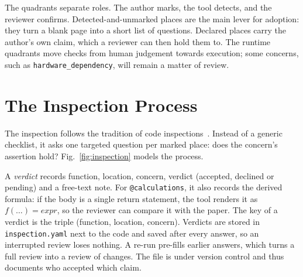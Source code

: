 \documentclass[conference,10pt]{IEEEtran}
\newcommand{\cc}[1]{\texttt{#1}}
\begin{document}
The quadrants separate roles. The author marks, the tool detects, and the reviewer confirms. Detected-and-unmarked places are the main lever for adoption: they turn a blank page into a short list of questions. Declared places carry the author's own claim, which a reviewer can then hold them to. The runtime quadrants move checks from human judgement towards execution; some concerns, such as \cc{hardware\_dependency}, will remain a matter of review.

\section{The Inspection Process}
The inspection follows the tradition of code inspections~\cite{fagan1976}. Instead of a generic checklist, it asks one targeted question per marked place: does the concern's assertion hold? Fig.~\ref{fig:inspection} models the process.

A \emph{verdict} records function, location, concern, verdict (accepted, declined or pending) and a free-text note. For \cc{@calculations}, it also records the derived formula: if the body is a single return statement, the tool renders it as $f(\ldots)=\mathit{expr}$, so the reviewer can compare it with the paper. The key of a verdict is the triple (function, location, concern). Verdicts are stored in \cc{inspection.yaml} next to the code and saved after every answer, so an interrupted review loses nothing. A re-run pre-fills earlier answers, which turns a full review into a review of changes. The file is under version control and thus documents who accepted which claim.
\end{document}
